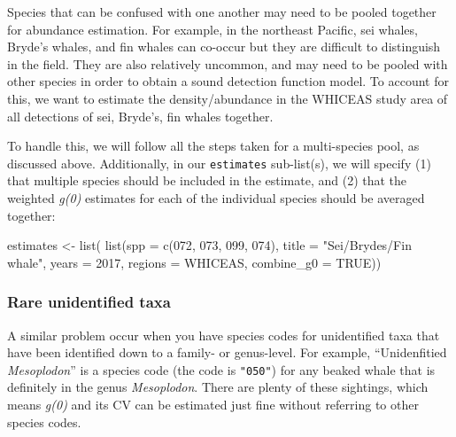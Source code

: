 \documentclass[
]{book}
\newenvironment{Shaded}{\begin{snugshade}}{\end{snugshade}}
\newcommand{\AttributeTok}[1]{\textcolor[rgb]{0.77,0.63,0.00}{#1}}
\newcommand{\ConstantTok}[1]{\textcolor[rgb]{0.00,0.00,0.00}{#1}}
\newcommand{\DecValTok}[1]{\textcolor[rgb]{0.00,0.00,0.81}{#1}}
\newcommand{\FunctionTok}[1]{\textcolor[rgb]{0.00,0.00,0.00}{#1}}
\newcommand{\NormalTok}[1]{#1}
\newcommand{\OtherTok}[1]{\textcolor[rgb]{0.56,0.35,0.01}{#1}}
\newcommand{\StringTok}[1]{\textcolor[rgb]{0.31,0.60,0.02}{#1}}
\begin{document}
Species that can be confused with one another may need to be pooled together for abundance estimation. For example, in the northeast Pacific, sei whales, Bryde's whales, and fin whales can co-occur but they are difficult to distinguish in the field. They are also relatively uncommon, and may need to be pooled with other species in order to obtain a sound detection function model. To account for this, we want to estimate the density/abundance in the WHICEAS study area of all detections of sei, Bryde's, fin whales together.

To handle this, we will follow all the steps taken for a multi-species pool, as discussed above. Additionally, in our \texttt{estimates} sub-list(s), we will specify (1) that multiple species should be included in the estimate, and (2) that the weighted \emph{g(0)} estimates for each of the individual species should be averaged together:

\begin{Shaded}
\begin{Highlighting}[]
\NormalTok{estimates }\OtherTok{\textless{}{-}} \FunctionTok{list}\NormalTok{(}
  \FunctionTok{list}\NormalTok{(}\AttributeTok{spp =} \FunctionTok{c}\NormalTok{(}\StringTok{\textquotesingle{}072\textquotesingle{}}\NormalTok{, }\StringTok{\textquotesingle{}073\textquotesingle{}}\NormalTok{, }\StringTok{\textquotesingle{}099\textquotesingle{}}\NormalTok{, }\StringTok{\textquotesingle{}074\textquotesingle{}}\NormalTok{),}
       \AttributeTok{title =} \StringTok{"Sei/Bryde\textquotesingle{}s/Fin whale"}\NormalTok{,}
       \AttributeTok{years =} \DecValTok{2017}\NormalTok{,}
       \AttributeTok{regions =} \StringTok{\textquotesingle{}WHICEAS\textquotesingle{}}\NormalTok{,}
       \AttributeTok{combine\_g0 =} \ConstantTok{TRUE}\NormalTok{))}
\end{Highlighting}
\end{Shaded}

\hypertarget{rare-unidentified-taxa}{%
\subsubsection*{Rare unidentified taxa}\label{rare-unidentified-taxa}}

A similar problem occur when you have species codes for unidentified taxa that have been identified down to a family- or genus-level. For example, ``Unidenfitied \emph{Mesoplodon}'' is a species code (the code is \texttt{"050"}) for any beaked whale that is definitely in the genus \emph{Mesoplodon}. There are plenty of these sightings, which means \emph{g(0)} and its CV can be estimated just fine without referring to other species codes.
\end{document}
